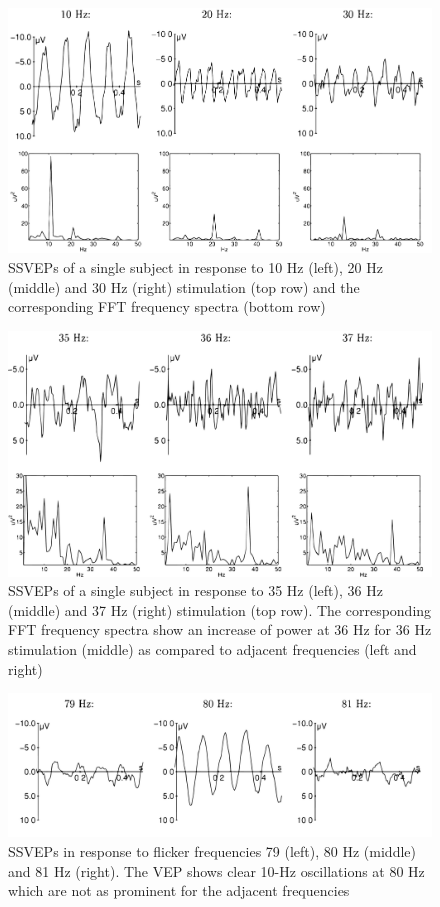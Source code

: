 \begin{figure}[ht]
	\centering
  	\includegraphics[scale = 0.21]{chapter2/26.pdf}
  	\caption{SSVEPs of a single subject in response to 10 Hz (left), 20 Hz (middle) and 30 Hz (right) stimulation (top row) and the corresponding FFT frequency spectra (bottom row)}
\end{figure}

\begin{figure}[ht]
	\centering
  	\includegraphics[scale = 0.2]{chapter2/27.pdf}
  	\caption{SSVEPs of a single subject in response to 35 Hz (left), 36 Hz (middle) and 37 Hz (right) stimulation (top row). The corresponding FFT frequency spectra show an increase of power at 36 Hz for 36 Hz stimulation (middle) as compared to adjacent frequencies (left and right)}
\end{figure}

\begin{figure}[ht]
	\centering
  	\includegraphics[scale = 0.18]{chapter2/28.pdf}
  	\caption{ SSVEPs in response to flicker frequencies 79 (left), 80 Hz (middle) and 81 Hz (right). The VEP shows clear 10-Hz oscillations at 80 Hz which are not as prominent for the adjacent frequencies}
\end{figure}


